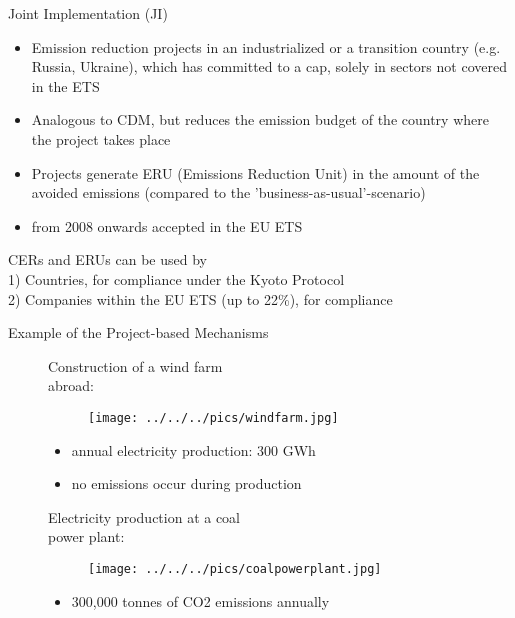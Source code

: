 


{Joint Implementation (JI)}
\begin{itemize}
\item <1-> Emission reduction projects in an industrialized or a transition country (e.g. Russia, Ukraine), which has committed to a cap, solely in sectors not covered in the ETS
\item <2-> Analogous to CDM, but reduces the emission budget of the country where the project takes place
\item <3-> Projects generate ERU (Emissions Reduction Unit) in the amount of the avoided emissions (compared to the 'business-as-usual'-scenario)
\item <4-> from 2008 onwards accepted in the EU ETS
\end{itemize}
CERs and ERUs can be used by \\
1) Countries, for compliance under the Kyoto Protocol \\
2) Companies within the EU ETS (up to 22\%), for compliance





{Example of the Project-based Mechanisms}
\begin{figure}[t]
\begin{minipage}[t]{0.475\textwidth}
Construction of a wind farm \\
abroad:
\vspace*{-0.2cm}
\begin{figure}[h!]
\centering
\texttt{[image: ../../../pics/windfarm.jpg]}
\end{figure}
\vspace*{-0.4cm}
\begin{itemize}
\item<1-> annual electricity production: 300 GWh
\item<1-> no emissions occur during production
\end{itemize}
\end{minipage}
\begin{minipage}[t]{0.475\textwidth}
Electricity production at a coal \\
power plant:
\vspace*{-0.2cm}
\begin{figure}[h!]
\centering
\texttt{[image: ../../../pics/coalpowerplant.jpg]}
\end{figure}
\vspace*{-0.4cm}
\begin{itemize}
\item<1-> 300,000 tonnes of CO2 emissions annually
\end{itemize}
\end{minipage}
\end{figure}

